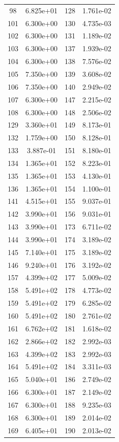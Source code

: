 \documentclass[12pt]{article}
\begin{document}
\begin{longtable}{@{}cccc@{}}
98 & 6.825e+01 & 128 & 1.761e-02 \\
101 & 6.300e+00 & 130 & 4.735e-03 \\
102 & 6.300e+00 & 131 & 1.189e-02 \\
103 & 6.300e+00 & 137 & 1.939e-02 \\
104 & 6.300e+00 & 138 & 7.576e-02 \\
105 & 7.350e+00 & 139 & 3.608e-02 \\
106 & 7.350e+00 & 140 & 2.949e-02 \\
107 & 6.300e+00 & 147 & 2.215e-02 \\
108 & 6.300e+00 & 148 & 2.506e-02 \\
129 & 3.360e+01 & 149 & 8.173e-01 \\
132 & 1.759e+00 & 150 & 8.128e-01 \\
133 & 3.887e-01 & 151 & 8.180e-01 \\
134 & 1.365e+01 & 152 & 8.223e-01 \\
135 & 1.365e+01 & 153 & 4.130e-01 \\
136 & 1.365e+01 & 154 & 1.100e-01 \\
141 & 4.515e+01 & 155 & 9.037e-01 \\
142 & 3.990e+01 & 156 & 9.031e-01 \\
143 & 3.990e+01 & 173 & 6.711e-02 \\
144 & 3.990e+01 & 174 & 3.189e-02 \\
145 & 7.140e+01 & 175 & 3.189e-02 \\
146 & 9.240e+01 & 176 & 3.192e-02 \\
157 & 4.399e+02 & 177 & 5.009e-02 \\
158 & 5.491e+02 & 178 & 4.773e-02 \\
159 & 5.491e+02 & 179 & 6.285e-02 \\
160 & 5.491e+02 & 180 & 2.761e-02 \\
161 & 6.762e+02 & 181 & 1.618e-02 \\
162 & 2.866e+02 & 182 & 2.992e-03 \\
163 & 4.399e+02 & 183 & 2.992e-03 \\
164 & 5.491e+02 & 184 & 3.311e-03 \\
165 & 5.040e+01 & 186 & 2.749e-02 \\
166 & 6.300e+01 & 187 & 2.149e-02 \\
167 & 6.300e+01 & 188 & 9.235e-03 \\
168 & 6.300e+01 & 189 & 2.014e-02 \\
169 & 6.405e+01 & 190 & 2.013e-02 \\

\end{longtable}
\end{document}
